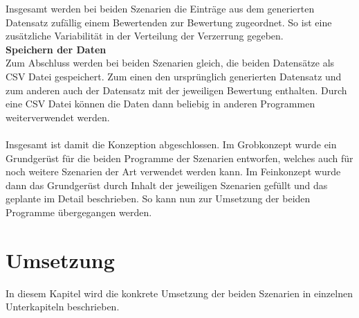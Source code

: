 \begin{onehalfspace}
Insgesamt werden bei beiden Szenarien die Einträge aus dem generierten Datensatz zufällig einem Bewertenden zur Bewertung zugeordnet. So ist eine zusätzliche Variabilität in der Verteilung der Verzerrung gegeben.\\
\textbf{Speichern der Daten}\\
Zum Abschluss werden bei beiden Szenarien gleich, die beiden Datensätze als CSV Datei gespeichert. Zum einen den ursprünglich generierten Datensatz und zum anderen auch der Datensatz mit der jeweiligen Bewertung enthalten. Durch eine CSV Datei können die Daten dann beliebig in anderen Programmen weiterverwendet werden.\\ \\
Insgesamt ist damit die Konzeption abgeschlossen. Im Grobkonzept wurde ein Grundgerüst für die beiden Programme der Szenarien entworfen, welches auch für noch weitere Szenarien der Art verwendet werden kann. Im Feinkonzept wurde dann das Grundgerüst durch Inhalt der jeweiligen Szenarien gefüllt und das geplante im Detail beschrieben. So kann nun zur Umsetzung der beiden Programme übergegangen werden. 
\newpage
\section{Umsetzung}
\label{umsetzung}
In diesem Kapitel wird die konkrete Umsetzung der beiden Szenarien in einzelnen Unterkapiteln beschrieben.

\end{onehalfspace}

